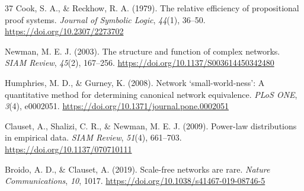 \documentclass[pdflatex,sn-basic,Numbered]{sn-jnl}
\begin{document}
\begin{thebibliography}{37}
 Cook, S. A., \& Reckhow, R. A. (1979). The relative efficiency of propositional proof systems. \emph{Journal of Symbolic Logic}, \emph{44}(1), 36--50. \url{https://doi.org/10.2307/2273702}

 Newman, M. E. J. (2003). The structure and function of complex networks. \emph{SIAM Review}, \emph{45}(2), 167--256. \url{https://doi.org/10.1137/S003614450342480}

 Humphries, M. D., \& Gurney, K. (2008). Network `small-world-ness': A quantitative method for determining canonical network equivalence. \emph{PLoS ONE}, \emph{3}(4), e0002051. \url{https://doi.org/10.1371/journal.pone.0002051}

 Clauset, A., Shalizi, C. R., \& Newman, M. E. J. (2009). Power-law distributions in empirical data. \emph{SIAM Review}, \emph{51}(4), 661--703. \url{https://doi.org/10.1137/070710111}

 Broido, A. D., \& Clauset, A. (2019). Scale-free networks are rare. \emph{Nature Communications}, \emph{10}, 1017. \url{https://doi.org/10.1038/s41467-019-08746-5}

\end{thebibliography}
\end{document}
